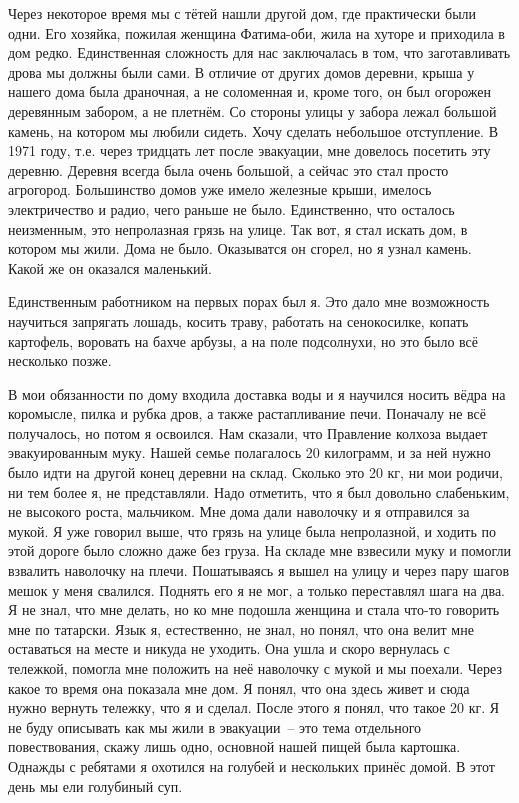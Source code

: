 Через некоторое время мы с тётей нашли другой дом, где практически были одни. Его хозяйка, пожилая женщина Фатима-оби, жила на хуторе и приходила в дом редко. Единственная сложность для нас заключалась в том, что заготавливать дрова мы должны были сами. В отличие от других домов деревни, крыша у нашего дома была драночная, а не соломенная и, кроме того, он был огорожен деревянным забором, а не плетнём. Со стороны улицы у забора лежал большой камень, на котором мы любили сидеть. Хочу сделать небольшое отступление. В 1971 году, т.е. через тридцать лет после эвакуации, мне довелось посетить эту деревню. Деревня всегда была очень большой, а сейчас это стал просто агрогород. Большинство домов уже имело железные крыши, имелось электричество и радио, чего раньше не было. Единственно, что осталось неизменным, это непролазная грязь на улице. Так вот, я стал искать дом, в котором мы жили. Дома не было. Оказыватся он сгорел, но я узнал камень. Какой же он оказался маленький.

Единственным работником на первых порах был я. Это дало мне возможность научиться запрягать лошадь, косить траву, работать на сенокосилке, копать картофель, воровать на бахче арбузы, а на поле подсолнухи, но это было всё несколько позже.

В мои обязанности по дому входила доставка воды и я научился носить вёдра на коромысле, пилка и рубка дров, а также растапливание печи. Поначалу не всё получалось, но потом я освоился. Нам сказали, что Правление колхоза выдает эвакуированным муку. Нашей семье полагалось 20 килограмм, и за ней нужно было идти на другой конец деревни на склад. Сколько это 20 кг, ни мои родичи, ни тем более я, не представляли. Надо отметить, что я был довольно слабеньким, не высокого роста, мальчиком. Мне дома дали наволочку и я отправился за мукой. Я уже говорил выше, что грязь на улице была непролазной, и ходить по этой дороге было сложно даже без груза. На складе мне взвесили муку и помогли взвалить наволочку на плечи. Пошатываясь я вышел на улицу и через пару шагов мешок у меня свалился. Поднять его я не мог, а только переставлял шага на два. Я не знал, что мне делать, но ко мне подошла женщина и стала что-то говорить мне по татарски. Язык я, естественно, не знал, но понял, что она велит мне оставаться на месте и никуда не уходить. Она ушла и скоро вернулась с тележкой, помогла мне положить на неё наволочку с мукой и мы поехали. Через какое то время она показала мне дом. Я понял, что она здесь живет и сюда нужно вернуть тележку, что я и сделал. После этого я понял, что такое 20 кг. Я не буду описывать как мы жили в эвакуации~-- это тема отдельного повествования, скажу лишь одно, основной нашей пищей была картошка. Однажды с ребятами я охотился на голубей и нескольких принёс домой. В этот день мы ели голубиный суп.

